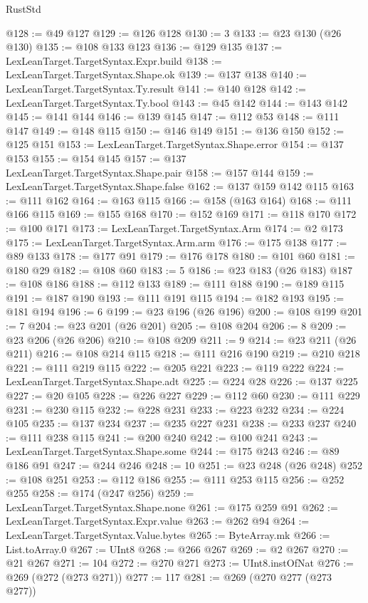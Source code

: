 \begin{lexlean}{RustStd}
\begin{coremodule}
{\begin{coremodule}
{{{{{{{{{{{{{{{{{{{{{{{{{{{{{{{{{{{{{{{{{{{{{{{{{{{{{{{{{{{{{{{{{{{{{{{{{{{{{{@128 := @49 @127
@129 := @126 @128
@130 := 3
@133 := @23 @130 (@26 @130)
@135 := @108 @133 @123
@136 := @129 @135
@137 := LexLeanTarget.TargetSyntax.Expr.build
@138 := LexLeanTarget.TargetSyntax.Shape.ok
@139 := @137 @138
@140 := LexLeanTarget.TargetSyntax.Ty.result
@141 := @140 @128
@142 := LexLeanTarget.TargetSyntax.Ty.bool
@143 := @45 @142
@144 := @143 @142
@145 := @141 @144
@146 := @139 @145
@147 := @112 @53
@148 := @111 @147
@149 := @148 @115
@150 := @146 @149
@151 := @136 @150
@152 := @125 @151
@153 := LexLeanTarget.TargetSyntax.Shape.error
@154 := @137 @153
@155 := @154 @145
@157 := @137 LexLeanTarget.TargetSyntax.Shape.pair
@158 := @157 @144
@159 := LexLeanTarget.TargetSyntax.Shape.false
@162 := @137 @159 @142 @115
@163 := @111 @162
@164 := @163 @115
@166 := @158 (@163 @164)
@168 := @111 @166 @115
@169 := @155 @168
@170 := @152 @169
@171 := @118 @170
@172 := @100 @171
@173 := LexLeanTarget.TargetSyntax.Arm
@174 := @2 @173
@175 := LexLeanTarget.TargetSyntax.Arm.arm
@176 := @175 @138
@177 := @89 @133
@178 := @177 @91
@179 := @176 @178
@180 := @101 @60
@181 := @180 @29
@182 := @108 @60
@183 := 5
@186 := @23 @183 (@26 @183)
@187 := @108 @186
@188 := @112 @133
@189 := @111 @188
@190 := @189 @115
@191 := @187 @190
@193 := @111 @191 @115
@194 := @182 @193
@195 := @181 @194
@196 := 6
@199 := @23 @196 (@26 @196)
@200 := @108 @199
@201 := 7
@204 := @23 @201 (@26 @201)
@205 := @108 @204
@206 := 8
@209 := @23 @206 (@26 @206)
@210 := @108 @209
@211 := 9
@214 := @23 @211 (@26 @211)
@216 := @108 @214 @115
@218 := @111 @216 @190
@219 := @210 @218
@221 := @111 @219 @115
@222 := @205 @221
@223 := @119 @222
@224 := LexLeanTarget.TargetSyntax.Shape.adt
@225 := @224 @28
@226 := @137 @225
@227 := @20 @105
@228 := @226 @227
@229 := @112 @60
@230 := @111 @229
@231 := @230 @115
@232 := @228 @231
@233 := @223 @232
@234 := @224 @105
@235 := @137 @234
@237 := @235 @227 @231
@238 := @233 @237
@240 := @111 @238 @115
@241 := @200 @240
@242 := @100 @241
@243 := LexLeanTarget.TargetSyntax.Shape.some
@244 := @175 @243
@246 := @89 @186 @91
@247 := @244 @246
@248 := 10
@251 := @23 @248 (@26 @248)
@252 := @108 @251
@253 := @112 @186
@255 := @111 @253 @115
@256 := @252 @255
@258 := @174 (@247 @256)
@259 := LexLeanTarget.TargetSyntax.Shape.none
@261 := @175 @259 @91
@262 := LexLeanTarget.TargetSyntax.Expr.value
@263 := @262 @94
@264 := LexLeanTarget.TargetSyntax.Value.bytes
@265 := ByteArray.mk
@266 := List.toArray.{0}
@267 := UInt8
@268 := @266 @267
@269 := @2 @267
@270 := @21 @267
@271 := 104
@272 := @270 @271
@273 := UInt8.instOfNat
@276 := @269 (@272 (@273 @271))
@277 := 117
@281 := @269 (@270 @277 (@273 @277))
}}}}}}}}}}}}}}}}}}}}}}}}}}}}}}}}}}}}}}}}}}}}}}}}}}}}}}}}}}}}}}}}}}}}}}}}}}}}}}
\end{coremodule}}
\end{coremodule}
\end{lexlean}
